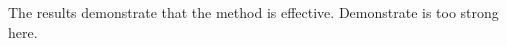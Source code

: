 \documentclass{article}
\newcommand{\myremark}[1]{#1}
\begin{document}
The results demonstrate that the method is effective.
\myremark{Demonstrate is too strong here.}
\end{document}
